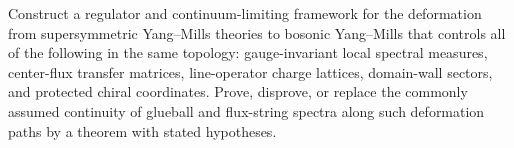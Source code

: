 \begin{openproblem}
\label{op:regulator-level-susy-breaking-spectral-bridge}
Construct a regulator and continuum-limiting framework for the deformation
from supersymmetric Yang--Mills theories to bosonic Yang--Mills that controls
all of the following in the same topology: gauge-invariant local spectral
measures, center-flux transfer matrices, line-operator charge lattices,
domain-wall sectors, and protected chiral coordinates.  Prove, disprove, or
replace the commonly assumed continuity of glueball and flux-string spectra
along such deformation paths by a theorem with stated hypotheses.
\end{openproblem}

